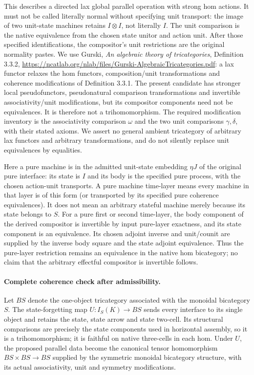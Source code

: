 \documentclass{article}
\begin{document}
This describes a directed lax global parallel operation with strong hom actions. It must not be called literally normal without specifying unit transport: the image of two unit-state machines retains $I\otimes I$, not literally $I$. The unit comparison is the native equivalence from the chosen state unitor and action unit. After those specified identifications, the compositor's unit restrictions are the original normality pastes. We use Gurski, \emph{An algebraic theory of tricategories}, Definition 3.3.2, \url{https://ncatlab.org/nlab/files/Gurski-AlgebraicTricategories.pdf}: a lax functor relaxes the hom functors, composition/unit transformations and coherence modifications of Definition 3.3.1. The present candidate has stronger local pseudofunctors, pseudonatural comparison transformations and invertible associativity/unit modifications, but its compositor components need not be equivalences. It is therefore not a trihomomorphism. The required modification inventory is the associativity comparison $\omega$ and the two unit comparisons $\gamma,\delta$, with their stated axioms. We assert no general ambient tricategory of arbitrary lax functors and arbitrary transformations, and do not silently replace unit equivalences by equalities.

Here a pure machine is in the admitted unit-state embedding $\eta J$ of the original pure interface: its state is $I$ and its body is the specified pure process, with the chosen action-unit transports. A pure machine time-layer means every machine in that layer is of this form (or transported by its specified pure coherence equivalences). It does not mean an arbitrary stateful machine merely because its state belongs to $S$. For a pure first or second time-layer, the body component of the derived compositor is invertible by input pure-layer exactness, and its state component is an equivalence. Its chosen adjoint inverse and unit/counit are supplied by the inverse body square and the state adjoint equivalence. Thus the pure-layer restriction remains an equivalence in the native hom bicategory; no claim that the arbitrary effectful compositor is invertible follows.

\paragraph{Complete coherence check after admissibility.} Let $BS$ denote the one-object tricategory associated with the monoidal bicategory $S$. The state-forgetting map $U:I_S(K)\to BS$ sends every interface to its single object and retains the state, state arrow and state two-cell. Its structural comparisons are precisely the state components used in horizontal assembly, so it is a trihomomorphism; it is faithful on native three-cells in each hom. Under $U$, the proposed parallel data become the canonical tensor homomorphism $BS\times BS\to BS$ supplied by the symmetric monoidal bicategory structure, with its actual associativity, unit and symmetry modifications.
\end{document}
